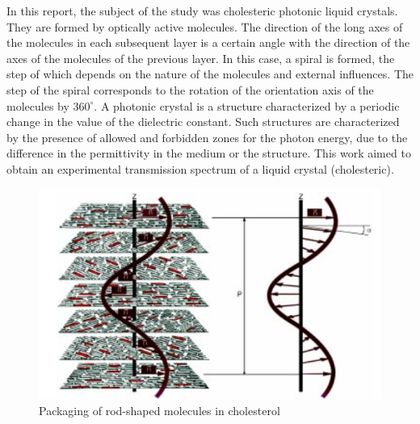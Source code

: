 \documentclass[a4paper, 12pt]{article}
\begin{document}
In this report, the subject of the study was cholesteric photonic liquid crystals. They are formed by optically active molecules. The direction of the long axes of the molecules in each subsequent layer is a certain angle with the direction of the axes of the molecules of the previous layer. In this case, a spiral is formed, the step of which depends on the nature of the molecules and external influences. The step of the spiral corresponds to the rotation of the orientation axis of the molecules by $360^{\circ}$. A photonic crystal is a structure characterized by a periodic change in the value of the dielectric constant. Such structures are characterized by the presence of allowed and forbidden zones for the photon energy, due to the difference in the permittivity in the medium or the structure. This work aimed to obtain an experimental transmission spectrum of a liquid crystal (cholesteric).
\begin{figure}[H]
\centering
\includegraphics[width=1\linewidth]{Spiral.png}
\caption{Packaging of rod-shaped molecules
in cholesterol \cite{jk}}
\label{fig:1}
\end{figure}
\end{document}
